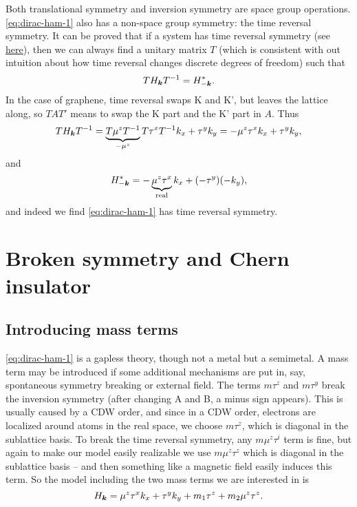 \documentclass[hyperref, a4paper]{article}
\begin{document}
Both translational symmetry and inversion symmetry are space group operations.
\eqref{eq:dirac-ham-1} also has a non-space group symmetry:
the time reversal symmetry.
It can be proved that if a system has time reversal symmetry 
(see \href{../group-and-topology-yang-qi/2022-4-12.pdf}{here}),
then we can always find a unitary matrix $T$ 
(which is consistent with out intuition about how time reversal changes discrete degrees of freedom)
such that 
\begin{equation}
    T H_{\vb*{k}} T^{-1} = H_{-\vb*{k}}^*.
\end{equation}
In the case of graphene,
time reversal swaps K and K', 
but leaves the lattice along,
so $T A T'$ means to swap the K part and the K' part in $A$.
Thus 
\[
    T H_{\vb*{k}} T^{-1}
    = \underbrace{T \mu^z T^{-1}}_{- \mu^z} T \tau^x T^{-1} k_x + \tau^y k_y
    = - \mu^z \tau^x k_x + \tau^y k_y,
\]
and 
\[
    H_{- \vb*{k}}^* = - \underbrace{\mu^z \tau^x}_{\text{real}} k_x + (-\tau^y) (-k_y),
\]
and indeed we find \eqref{eq:dirac-ham-1} has time reversal symmetry.

\section{Broken symmetry and Chern insulator}

\subsection{Introducing mass terms}

\eqref{eq:dirac-ham-1} is a gapless theory,
though not a metal but a semimetal.
A mass term may be introduced if some additional mechanisms are put in,
say, spontaneous symmetry breaking or external field.
The terms $m \tau^z$ and $m \tau^y$ break the inversion symmetry 
(after changing A and B, a minus sign appears).
This is usually caused by a CDW order,
and since in a CDW order, electrons are localized around atoms in the real space,
we choose $m \tau^z$,
which is diagonal in the sublattice basis.
To break the time reversal symmetry, any $m \mu^z \tau^i$ term is fine,
but again to make our model easily realizable 
we use $m \mu^z \tau^z$ which is diagonal in the sublattice basis
-- and then something like a magnetic field easily induces this term.
So the model including the two mass terms we are interested in is 
\begin{equation}
    H_{\vb*{k}} = \mu^z \tau^x k_x + \tau^y k_y + m_1 \tau^z + m_2 \mu^z \tau^z.
    \label{eq:model-ham}
\end{equation}
\end{document}
